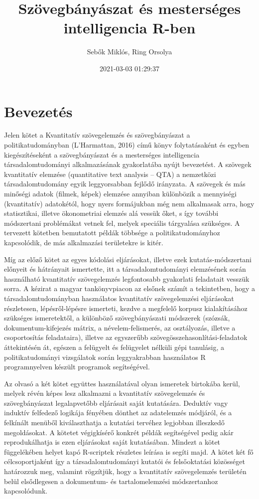 \documentclass[
]{book}
\title{Szövegbányászat és mesterséges intelligencia R-ben}
\author{Sebők Miklós, Ring Orsolya}
\date{2021-03-03 01:29:37}
\begin{document}
\frontmatter
\maketitle

\mainmatter
\hypertarget{bevezetuxe9s}{%
\chapter{Bevezetés}\label{bevezetuxe9s}}

Jelen kötet a Kvantitatív szövegelemzés és szövegbányászat a
politikatudományban (L'Harmattan, 2016) című könyv folytatásaként és
egyben kiegészítéseként a szövegbányászat és a mesterséges intelligencia
társadalomtudományi alkalmazásának gyakorlatába nyújt bevezetést. A
szövegek kvantitatív elemzése (quantitative text analysis -- QTA) a
nemzetközi társadalomtudomány egyik leggyorsabban fejlődő irányzata. A
szövegek és más minőségi adatok (filmek, képek) elemzése annyiban
különbözik a mennyiségi (kvantitatív) adatokétól, hogy nyers formájukban
még nem alkalmasak arra, hogy statisztikai, illetve ökonometriai elemzés
alá vessük őket, s így további módszertani problémákat vetnek fel,
melyek speciális tárgyalása szükséges. A tervezett kötetben bemutatott
példák többsége a politikatudományhoz kapcsolódik, de más alkalmazási
területekre is kitér.

Míg az előző kötet az egyes kódolási eljárásokat, illetve ezek
kutatás-módszertani előnyeit és hátrányait ismertette, itt a
társadalomtudományi elemzésének során használható kvantitatív
szövegelemzés legfontosabb gyakorlati feladatait vesszük sorra. A
kézirat a magyar tankönyvpiacon az elsőnek számít a tekintetben, hogy a
társadalomtudományban használatos kvantitatív szövegelemzési eljárásokat
részletesen, lépésről-lépésre ismerteti, kezdve a megfelelő korpusz
kialakításához szükséges ismeretektől, a különböző szövegbányászati
módszerek (szózsák, dokumentum-kifejezés mátrix, a névelem-felismerés,
az osztályozás, illetve a csoportosítás feladataira), illetve az
egyszerűbb szövegösszehasonlítási-feladatok áttekintésén át, egészen a
felügyelt és felügyelet nélküli gépi tanulásig, a politikatudományi
vizsgálatok során leggyakrabban használatos R programnyelven készült
programok segítségével.

Az olvasó a két kötet együttes használatával olyan ismeretek birtokába
kerül, melyek révén képes lesz alkalmazni a kvantitatív szövegelemzés és
szövegbányászat legalapvetőbb eljárásait saját kutatására. Deduktív vagy
induktív felfedező logikája fényében dönthet az adatelemzés módjáról, és
a felkínált menüből kiválaszthatja a kutatási tervéhez legjobban
illeszkedő megoldásokat. A kötetet végigkísérő konkrét példák
segítségével pedig akár reprodukálhatja is ezen eljárásokat saját
kutatásában. Mindezt a kötet függelékében helyet kapó R-scriptek
részletes leírása is segíti majd. A kötet két fő célcsoportjaként így a
társadalomtudományi kutatói és felsőoktatási közösséget határozzuk meg,
valamint rögzítjük, hogy a kvantitatív szövegelemzés területén belül
elsődlegesen a dokumentum- és tartalomelemzési módszertanhoz
kapcsolódunk.
\end{document}
